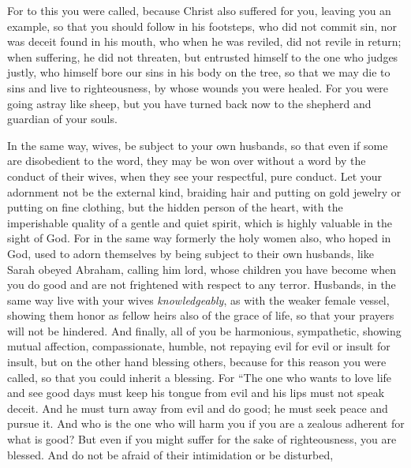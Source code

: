 \begin{biblechapter}
\verse For to this you were called, because Christ also suffered for you, leaving you an example, so that you should follow in his footsteps,
\verse who did not commit sin, nor was deceit found in his mouth,
\verse who when he was reviled, did not revile in return; when suffering, he did not threaten, but entrusted himself to the one who judges justly,
\verse who himself bore our sins in his body on the tree, so that we may die to sins and live to righteousness, by whose wounds you were healed.
\verse For you were going astray like sheep, but you have turned back now to the shepherd and guardian of your souls.
\end{biblechapter}

\begin{biblechapter} %
 In the same way, wives, be subject to your own husbands, so that even if some are disobedient to the word, they may be won over without a word by the conduct of their wives,
\verse when they see your respectful, pure conduct.
\verse Let your adornment not be the external kind, braiding hair and putting on gold jewelry or putting on fine clothing,
\verse but the hidden person of the heart, with the imperishable quality of a gentle and quiet spirit, which is highly valuable in the sight of God.
\verse For in the same way formerly the holy women also, who hoped in God, used to adorn themselves by being subject to their own husbands,
\verse like Sarah obeyed Abraham, calling him lord, whose children you have become when you do good and are not frightened with respect to any terror.
\verse Husbands, in the same way live with your wives \textit{knowledgeably}, as with the weaker female vessel, showing them honor as fellow heirs also of the grace of life, so that your prayers will not be hindered.
 And finally, all of you be harmonious, sympathetic, showing mutual affection, compassionate, humble,
\verse not repaying evil for evil or insult for insult, but on the other hand blessing others, because for this reason you were called, so that you could inherit a blessing.
\verse For
\verse “The one who wants to love life 
and see good days 
must keep his tongue from evil 
and his lips must not speak deceit.
\verse And he must turn away from evil and do good; 
he must seek peace and pursue it.
 And who is the one who will harm you if you are a zealous adherent for what is good?
\verse But even if you might suffer for the sake of righteousness, you are blessed. And do not be afraid of their intimidation or be disturbed,

\end{biblechapter}
